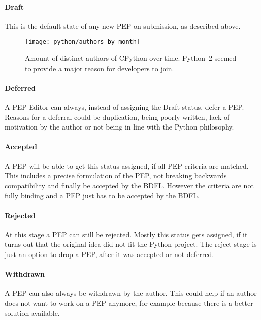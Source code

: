 \paragraph{Draft}

This is the default state of any new \ac{PEP} on submission, as described
above.

\begin{figure}[htbp]
  \centering
  \texttt{[image: python/authors\_by\_month]}
  \caption[Authors by Month, Python]
  {Amount of distinct authors of CPython over time. Python~2 seemed to provide
    a major reason for developers to join.}
  \label{fig:python:abm}
\end{figure}

\paragraph{Deferred}

A \ac{PEP} Editor can always, instead of assigning the Draft status, defer a
\ac{PEP}. Reasons for a deferral could be duplication, being poorly written,
lack of motivation by the author or not being in line with the Python
philosophy.

\paragraph{Accepted}

A \ac{PEP} will be able to get this status assigned, if all \ac{PEP} criteria
are matched. This includes a precise formulation of the \ac{PEP}, not breaking
backwards compatibility and finally be accepted by the \ac{BDFL}. However the
criteria are not fully binding and a \ac{PEP} just has to be accepted by the
\ac{BDFL}.

\paragraph{Rejected}

At this stage a \ac{PEP} can still be rejected. Mostly this status gets
assigned, if it turns out that the original idea did not fit the Python
project. The reject stage is just an option to drop a \ac{PEP}, after it was
accepted or not deferred.

\paragraph{Withdrawn}

A \ac{PEP} can also always be withdrawn by the author. This could help if an
author does not want to work on a \ac{PEP} anymore, for example because there
is a better solution available.

